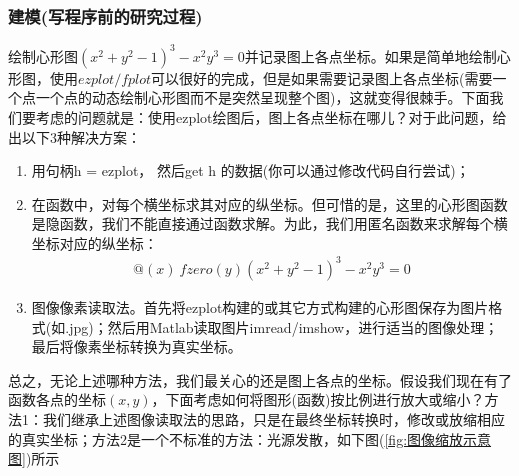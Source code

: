         \subsubsection{建模(写程序前的研究过程)}
            \par
            绘制心形图$(x^2+y^2-1)^3-x^2y^3=0$并记录图上各点坐标。如果是简单地绘制心形图，使用$ezplot/fplot$可以很好的完成，但是如果需要记录图上各点坐标(需要一个点一个点的动态绘制心形图而不是突然呈现整个图)，这就变得很棘手。下面我们要考虑的问题就是：使用ezplot绘图后，图上各点坐标在哪儿？对于此问题，给出以下3种解决方案：
            \begin{enumerate}
            \item 用句柄h = ezplot， 然后get h 的数据(你可以通过修改代码自行尝试)；
            \item 在函数中，对每个横坐标求其对应的纵坐标。但可惜的是，这里的心形图函数是隐函数，我们不能直接通过函数求解。为此，我们用匿名函数来求解每个横坐标对应的纵坐标：
            \begin{align*}
            @(x) \ fzero(y) (x^2+y^2-1)^3-x^2y^3 = 0
            \end{align*}
            \item 图像像素读取法。首先将ezplot构建的或其它方式构建的心形图保存为图片格式(如.jpg)；然后用Matlab读取图片imread/imshow，进行适当的图像处理；最后将像素坐标转换为真实坐标。
            \end{enumerate}
            \par
            总之，无论上述哪种方法，我们最关心的还是图上各点的坐标。假设我们现在有了函数各点的坐标$(x,y)$，下面考虑如何将图形(函数)按比例进行放大或缩小？方法1：我们继承上述图像读取法的思路，只是在最终坐标转换时，修改或放缩相应的真实坐标；方法2是一个不标准的方法：光源发散，如下图(\ref{fig:图像缩放示意图})所示

